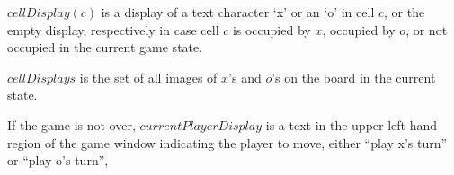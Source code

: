 \documentclass{led_doc}
\begin{document}
\begin{ledCmnt}
$cellDisplay(c)$ is a display of a text character `x' or an `o' in cell $c$,
or the empty display, respectively in case cell $c$ is occupied by $x$, occupied
by $o$, or not occupied in the current game state.
\end{ledCmnt}

\begin{ledDef}
\end{ledDef}

\begin{ledDef}
\end{ledDef}

\begin{ledDef}
\end{ledDef}

\begin{ledCmnt}
$cellDisplays$ is the set of all images of $x$'s and $o$'s on the board in the current state.
\end{ledCmnt}

\begin{ledDef}
\end{ledDef}

\begin{ledDef}
\end{ledDef}

\begin{ledCmnt}
If the game is not over, $currentPlayerDisplay$ is a text in the upper left hand
region of the game window indicating the player to move, either ``play x's turn'' or
``play o's turn'',
\end{ledCmnt}

\begin{ledDef}
\end{ledDef}
\end{document}
